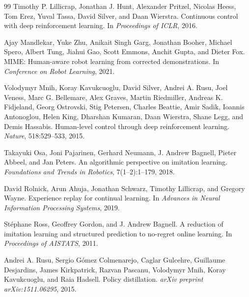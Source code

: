 \documentclass{article}
\begin{document}
\begin{thebibliography}{99}
Timothy P. Lillicrap, Jonathan J. Hunt, Alexander Pritzel, Nicolas Heess, Tom Erez, Yuval Tassa, David Silver, and Daan Wierstra.
\newblock Continuous control with deep reinforcement learning.
\newblock In \emph{Proceedings of ICLR}, 2016.

Ajay Mandlekar, Yuke Zhu, Anikait Singh Garg, Jonathan Booher, Michael Spero, Albert Tung, Jiahui Gao, Scott Emmons, Anchit Gupta, and Dieter Fox.
\newblock MIME: Human-aware robot learning from corrected demonstrations.
\newblock In \emph{Conference on Robot Learning}, 2021.

Volodymyr Mnih, Koray Kavukcuoglu, David Silver, Andrei A. Rusu, Joel Veness, Marc G. Bellemare, Alex Graves, Martin Riedmiller, Andreas K. Fidjeland, Georg Ostrovski, Stig Petersen, Charles Beattie, Amir Sadik, Ioannis Antonoglou, Helen King, Dharshan Kumaran, Daan Wierstra, Shane Legg, and Demis Hassabis.
\newblock Human-level control through deep reinforcement learning.
\newblock \emph{Nature}, 518:529--533, 2015.

Takayuki Osa, Joni Pajarinen, Gerhard Neumann, J. Andrew Bagnell, Pieter Abbeel, and Jan Peters.
\newblock An algorithmic perspective on imitation learning.
\newblock \emph{Foundations and Trends in Robotics}, 7(1--2):1--179, 2018.

David Rolnick, Arun Ahuja, Jonathan Schwarz, Timothy Lillicrap, and Gregory Wayne.
\newblock Experience replay for continual learning.
\newblock In \emph{Advances in Neural Information Processing Systems}, 2019.

St{\'e}phane Ross, Geoffrey Gordon, and J. Andrew Bagnell.
\newblock A reduction of imitation learning and structured prediction to no-regret online learning.
\newblock In \emph{Proceedings of AISTATS}, 2011.

Andrei A. Rusu, Sergio G{\'o}mez Colmenarejo, Caglar Gulcehre, Guillaume Desjardins, James Kirkpatrick, Razvan Pascanu, Volodymyr Mnih, Koray Kavukcuoglu, and Raia Hadsell.
\newblock Policy distillation.
\newblock \emph{arXiv preprint arXiv:1511.06295}, 2015.


\end{thebibliography}
\end{document}

